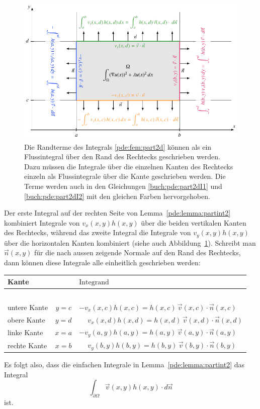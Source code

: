 \begin{figure}
\centering
\includegraphics{chapters/70-pde/images/2dpart.pdf}
\caption{Die Randterme des Integrals \eqref{pde:fem:part2d}  können
als ein Flussintegral über den Rand des Rechtecks geschrieben werden.
%
Dazu müssen die Integrale über die einzelnen Kanten des Rechtecks einzeln
als Flussintegrale über die Kante geschrieben werden.
Die Terme werden auch in den Gleichungen
\eqref{buch:pde:part2dI1} und \eqref{buch:pde:part2dI2}
mit den gleichen Farben hervorgehoben.
\label{buch:pde:pfadintegral}}
\end{figure}
Der erste Integral auf der rechten Seite von Lemma~\ref{pde:lemma:partint2}
kombiniert Integrale von $v_x(x,y) h(x,y)$ über die beiden vertikalen Kanten 
des Rechtecks, während das zweite Integral die Integrale von
$v_y(x,y)h(x,y)$ über die horizontalen Kanten kombiniert (siehe auch
Abbildung~\ref{buch:pde:pfadintegral}).
Schreibt man $\vec{n}(x,y)$ für die nach aussen zeigende Normale auf den Rand 
des Rechtecks, dann können diese Integrale alle einheitlich geschrieben
werden:
\begin{center}
\begin{tabular}{l >{$}c<{$} >{$}l<{$}}
Kante& &\text{Integrand}
\\[2pt]
\hline
\\[-7pt]
\color{orange}untere Kante
	&y=c
	&         - v_x(x,c)h(x,c) = h(x,c) \, \vec{v}(x,c) \cdot \vec{n}(x,c)
\\[4pt]
\color{gruen}obere Kante
	&y=d
	&\phantom{-}v_x(x,d)h(x,d) = h(x,d) \, \vec{v}(x,d) \cdot \vec{n}(x,d)
\\[4pt]
\color{azure}linke Kante
	&x=a
	&         - v_y(a,y)h(a,y) = h(a,y) \, \vec{v}(a,y) \cdot \vec{n}(a,y)
\\[4pt]
\color{magenta}rechte Kante
	&x=b
 	&\phantom{-}v_y(b,y)h(b,y) = h(b,y) \, \vec{v}(b,y) \cdot \vec{n}(b,y)
\\[4pt]
\hline
\end{tabular}
\end{center}
Es folgt also, dass die einfachen Integrale in 
Lemma~\ref{pde:lemma:partint2} das Integral
\[
\int_{\partial\Omega} \vec{v}(x,y) h(x,y) \cdot d\vec{n}
\]
ist.

